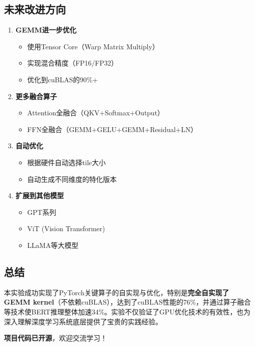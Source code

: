 \documentclass[12pt,a4paper]{article}
\begin{document}
\subsection{未来改进方向}

\begin{enumerate}
    \item \textbf{GEMM进一步优化}
    \begin{itemize}
        \item 使用Tensor Core（Warp Matrix Multiply）
        \item 实现混合精度（FP16/FP32）
        \item 优化到cuBLAS的90\%+
    \end{itemize}
    
    \item \textbf{更多融合算子}
    \begin{itemize}
        \item Attention全融合（QKV+Softmax+Output）
        \item FFN全融合（GEMM+GELU+GEMM+Residual+LN）
    \end{itemize}
    
    \item \textbf{自动优化}
    \begin{itemize}
        \item 根据硬件自动选择tile大小
        \item 自动生成不同维度的特化版本
    \end{itemize}
    
    \item \textbf{扩展到其他模型}
    \begin{itemize}
        \item GPT系列
        \item ViT (Vision Transformer)
        \item LLaMA等大模型
    \end{itemize}
\end{enumerate}

\subsection{总结}

本实验成功实现了PyTorch关键算子的自实现与优化，特别是\textbf{完全自实现了GEMM kernel}（不依赖cuBLAS），达到了cuBLAS性能的76\%，并通过算子融合等技术使BERT推理整体加速34\%。实验不仅验证了GPU优化技术的有效性，也为深入理解深度学习系统底层提供了宝贵的实践经验。

\textbf{项目代码已开源}，欢迎交流学习！
\end{document}
